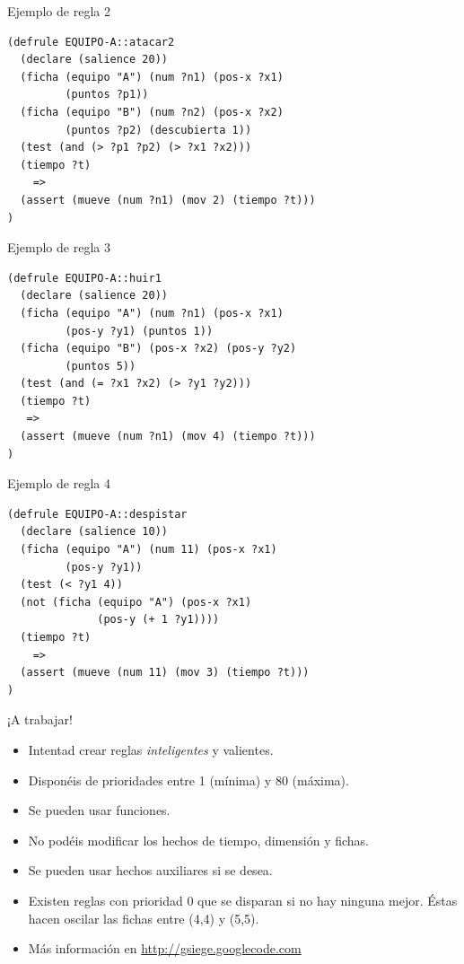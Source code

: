 \documentclass[smaller,spanish,xcolor=svgnames]{beamer}
\begin{document}
\begin{frame}[fragile]{Ejemplo de regla 2}
\begin{verbatim}
(defrule EQUIPO-A::atacar2
  (declare (salience 20))
  (ficha (equipo "A") (num ?n1) (pos-x ?x1)
         (puntos ?p1))
  (ficha (equipo "B") (num ?n2) (pos-x ?x2)
         (puntos ?p2) (descubierta 1))
  (test (and (> ?p1 ?p2) (> ?x1 ?x2)))
  (tiempo ?t)
    =>
  (assert (mueve (num ?n1) (mov 2) (tiempo ?t)))
)
\end{verbatim}
\end{frame}

\begin{frame}[fragile]{Ejemplo de regla 3}
\begin{verbatim}
(defrule EQUIPO-A::huir1
  (declare (salience 20))
  (ficha (equipo "A") (num ?n1) (pos-x ?x1)
         (pos-y ?y1) (puntos 1))
  (ficha (equipo "B") (pos-x ?x2) (pos-y ?y2)
         (puntos 5))
  (test (and (= ?x1 ?x2) (> ?y1 ?y2)))
  (tiempo ?t)
   =>
  (assert (mueve (num ?n1) (mov 4) (tiempo ?t)))
)
\end{verbatim}
\end{frame}

\begin{frame}[fragile]{Ejemplo de regla 4}
\begin{verbatim}
(defrule EQUIPO-A::despistar
  (declare (salience 10))
  (ficha (equipo "A") (num 11) (pos-x ?x1)
         (pos-y ?y1))
  (test (< ?y1 4))
  (not (ficha (equipo "A") (pos-x ?x1)
              (pos-y (+ 1 ?y1))))
  (tiempo ?t)
    =>
  (assert (mueve (num 11) (mov 3) (tiempo ?t)))
)
\end{verbatim}
\end{frame}

\begin{frame}{¡A trabajar!}
  \begin{itemize}
  \item Intentad crear reglas \textit{inteligentes} y valientes.
  \item Disponéis de prioridades entre 1 (mínima) y 80 (máxima).
  \item Se pueden usar funciones.
  \item No podéis modificar los hechos de tiempo, dimensión y fichas.
  \item Se pueden usar hechos auxiliares si se desea.
  \item Existen reglas con prioridad 0 que se disparan si no hay ninguna
    mejor. Éstas hacen oscilar las fichas entre (4,4) y (5,5).
  \item Más información en \url{http://gsiege.googlecode.com}
  \end{itemize}
\end{frame}
\end{document}
